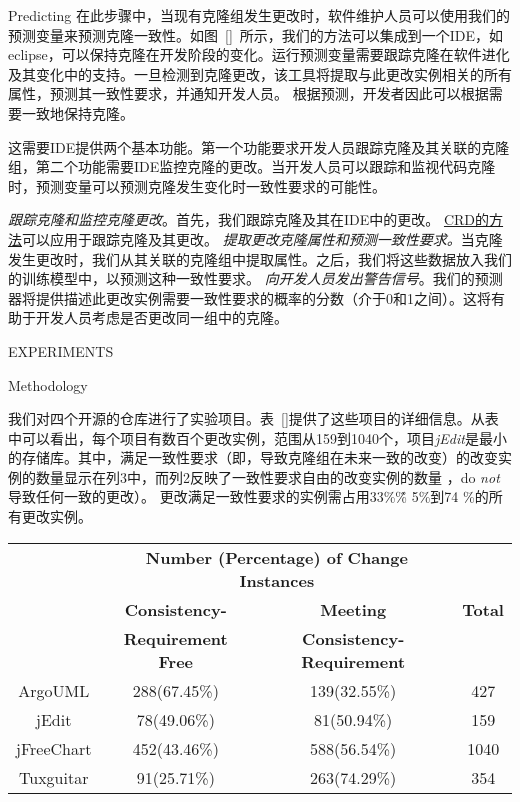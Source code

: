 {Predicting} 
在此步骤中，当现有克隆组发生更改时，软件维护人员可以使用我们的预测变量来预测克隆一致性。如图~\ref{}~所示，我们的方法可以集成到一个IDE，如eclipse，可以保持克隆在开发阶段的变化。运行预测变量需要跟踪克隆在软件进化及其变化中的支持。一旦检测到克隆更改，该工具将提取与此更改实例相关的所有属性，预测其一致性要求，并通知开发人员。
根据预测，开发者因此可以根据需要一致地保持克隆。

这需要IDE提供两个基本功能。第一个功能要求开发人员跟踪克隆及其关联的克隆组，第二个功能需要IDE监控克隆的更改。当开发人员可以跟踪和监视代码克隆时，预测变量可以预测克隆发生变化时一致性要求的可能性。 {\emph {跟踪克隆和监控克隆更改}。首先，我们跟踪克隆及其在IDE中的更改。 \underline {CRD的方法}可以应用于跟踪克隆及其更改。 \emph {提取更改克隆属性和预测一致性要求。}当克隆发生更改时，我们从其关联的克隆组中提取属性。之后，我们将这些数据放入我们的训练模型中，以预测这种一致性要求。 \emph {向开发人员发出警告信号}。我们的预测器将提供描述此更改实例需要一致性要求的概率的分数（介于0和1之间）。这将有助于开发人员考虑是否更改同一组中的克隆。

{EXPERIMENTS}

{Methodology}

我们对四个开源的仓库进行了实验项目。表~\ref {}提供了这些项目的详细信息。从表中可以看出，每个项目有数百个更改实例，范围从159到1040个，项目{\em  jEdit}是最小的存储库。其中，满足一致性要求（即，导致克隆组在未来一致的改变）的改变实例的数量显示在列3中，而列2反映了一致性要求自由的改变实例的数量 ，do {\em not }导致任何一致的更改）。
更改满足一致性要求的实例需占用33\%\~\% 5\%到74 \%的所有更改实例。

\begin{table}[htbp]
\vspace{0.5em}\centering\wuhao
\begin{tabular}{cccc}
\toprule[1.5pt]
~\multirow{3}{*}{\textbf{Project}}& \multicolumn{2}{c}{\textbf{Number (Percentage) of Change Instances}} & \multirow{3}{*}{\textbf{Total}}\\ 
 \cline{2-3}
 ~& \textbf{Consistency-} &\textbf{Meeting} & ~\\
 &\textbf{Requirement Free}&\textbf{Consistency-Requirement}&\\
\midrule[1pt]
ArgoUML&288(67.45\%)&139(32.55\%)&427\\
jEdit&78(49.06\%)&81(50.94\%)&159\\
jFreeChart&452(43.46\%)&588(56.54\%)&1040\\
Tuxguitar&91(25.71\%)&263(74.29\%)&354\\
\bottomrule[1.5pt]
\end{tabular}
\end{table}

}
